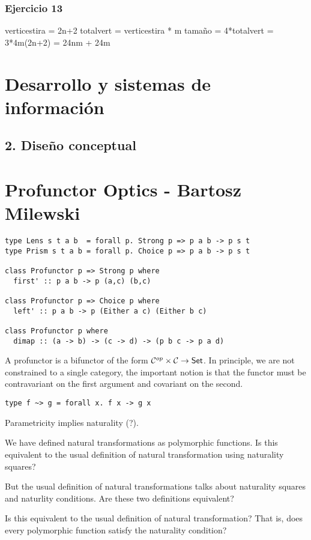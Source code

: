 \documentclass[11pt]{article}
\begin{document}
\subsubsection*{Ejercicio 13}
\label{sec-10-3-2}
verticestira = 2n+2
totalvert = verticestira * m
tamaño = 4*totalvert = 3*4m(2n+2) = 24nm + 24m

\section*{Desarrollo y sistemas de información}
\label{sec-11}
\subsection*{2. Diseño conceptual}
\label{sec-11-1}
\section*{Profunctor Optics - Bartosz Milewski}
\label{sec-12}
\begin{verbatim}
type Lens s t a b  = forall p. Strong p => p a b -> p s t
type Prism s t a b = forall p. Choice p => p a b -> p s t

class Profunctor p => Strong p where
  first' :: p a b -> p (a,c) (b,c)

class Profunctor p => Choice p where
  left' :: p a b -> p (Either a c) (Either b c)

class Profunctor p where
  dimap :: (a -> b) -> (c -> d) -> (p b c -> p a d)
\end{verbatim}

A profunctor is a bifunctor of the form ${\cal C}^{op} \times {\cal C} \to \mathsf{Set}$.
In principle, we are not constrained to a single category,
the important notion is that the functor must be contravariant
on the first argument and covariant on the second.

\begin{verbatim}
type f ~> g = forall x. f x -> g x
\end{verbatim}

Parametricity implies naturality (?).

We have defined natural transformations as polymorphic functions.
Is this equivalent to the usual definition of natural transformation using naturality squares?

But the usual definition of natural transformations talks about naturality squares
and naturlity conditions. Are these two definitions equivalent?

Is this equivalent to the usual definition of natural transformation?
That is, does every polymorphic function satisfy the naturality condition?
\end{document}
